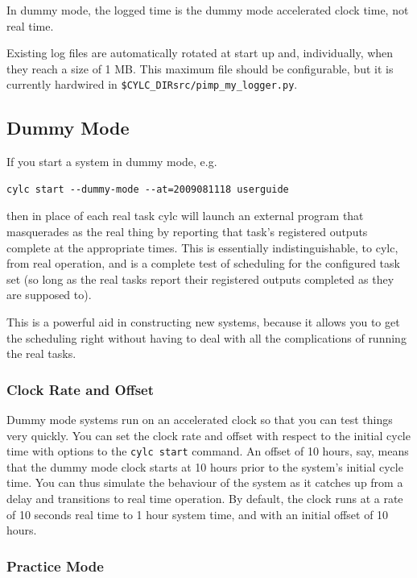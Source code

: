 \documentclass[11pt,a4paper]{article}
\begin{document}
In dummy mode, the logged time is the dummy mode accelerated clock time, not 
real time.

Existing log files are automatically rotated at start up and,
individually, when they reach a size of 1 MB.  This maximum file 
should be configurable, but it is currently hardwired in
\lstinline=$CYLC_DIRsrc/pimp_my_logger.py=.

\subsection{Dummy Mode} 
\label{DummyMode}

If you start a system in dummy mode, e.g.\:

\begin{lstlisting}
cylc start --dummy-mode --at=2009081118 userguide
\end{lstlisting}

then in place of each real task cylc will launch an external program
that masquerades as the real thing by reporting that task's registered
outputs complete at the appropriate times. This is essentially
indistinguishable, to cylc, from real operation, and is a complete test
of scheduling for the configured task set (so long as the real tasks
report their registered outputs completed as they are supposed to). 

This is a powerful aid in constructing new systems, because it allows
you to get the scheduling right without having to deal with all the
complications of running the real tasks.

\subsubsection{Clock Rate and Offset}

Dummy mode systems run on an accelerated clock so that you can test
things very quickly. You can set the clock rate and offset with respect
to the initial cycle time with options to the \lstinline=cylc start=
command. An offset of 10 hours, say, means that the dummy mode clock
starts at 10 hours prior to the system's initial cycle time.  You can
thus simulate the behaviour of the system as it catches up from a delay
and transitions to real time operation.  By default, the clock runs at a
rate of 10 seconds real time to 1 hour system time, and with an initial
offset of 10 hours. 

\subsubsection{Practice Mode}
\end{document}
